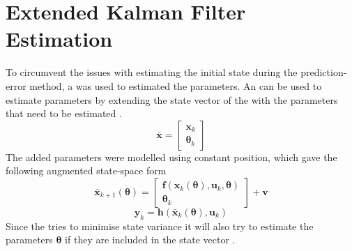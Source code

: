 \section{Extended Kalman Filter Estimation}\label{sec:KalmanEstimation}
To circumvent the issues with estimating the initial state during the prediction-error method, a \abbrEKF was used to estimated the parameters. An \abbrEKF can  be used to estimate parameters by extending the state vector of the \abbrEKF with the parameters that need to be estimated \citep{Roger}.
\begin{equation}
\bar{\boldsymbol{x}} = \begin{bmatrix}
\boldsymbol{x}_k\\
\boldsymbol{\theta}_k
\end{bmatrix}
\end{equation}
The added parameters were modelled using constant position, which gave the following augmented state-space form 
\begin{equation}
\bar{\boldsymbol{x}}_{k+1}(\boldsymbol{\theta}) =\begin{bmatrix}
\boldsymbol{f}(\boldsymbol{x}_k(\boldsymbol{\theta}),\boldsymbol{u}_k,\boldsymbol{\theta})\\
\boldsymbol{\theta}_k
\end{bmatrix} 
+\boldsymbol{v}
\end{equation}
\begin{equation}
\boldsymbol{y}_k=\boldsymbol{h}(\bar{\boldsymbol{x}}_k(\boldsymbol{\theta}),\boldsymbol{u}_k)
\end{equation}
Since the \abbrEKF tries to minimise state variance it will also try to estimate the parameters $\boldsymbol{\theta}$ if they are included in the state vector \citep{Roger}.

